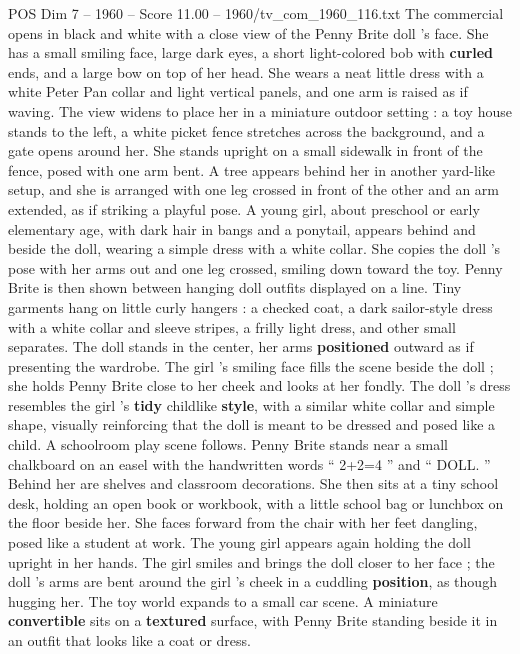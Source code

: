 \begin{textsample}{POS Dim 7 – 1960 – Score 11.00 – 1960/tv\_com\_1960\_116.txt}  \label{ex:f7_pos_030}
The commercial opens in black and white with a close view of the Penny Brite doll ’s face.
She has a small smiling face, large dark eyes, a short light-colored bob with \textbf{curled} ends, and a large bow on top of her head.
She wears a neat little dress with a white Peter Pan collar and light vertical panels, and one arm is raised as if waving.
The view widens to place her in a miniature outdoor setting : a toy house stands to the left, a white picket fence stretches across the background, and a gate opens around her.
She stands upright on a small sidewalk in front of the fence, posed with one arm bent.
A tree appears behind her in another yard-like setup, and she is arranged with one leg crossed in front of the other and an arm extended, as if striking a playful pose.
A young girl, about preschool or early elementary age, with dark hair in bangs and a ponytail, appears behind and beside the doll, wearing a simple dress with a white collar.
She copies the doll ’s pose with her arms out and one leg crossed, smiling down toward the toy.
Penny Brite is then shown between hanging doll outfits displayed on a line.
Tiny garments hang on little curly hangers : a checked coat, a dark sailor-style dress with a white collar and sleeve stripes, a frilly light dress, and other small separates.
The doll stands in the center, her arms \textbf{positioned} outward as if presenting the wardrobe.
The girl ’s smiling face fills the scene beside the doll ; she holds Penny Brite close to her cheek and looks at her fondly.
The doll ’s dress resembles the girl ’s \textbf{tidy} childlike \textbf{style}, with a similar white collar and simple shape, visually reinforcing that the doll is meant to be dressed and posed like a child.
A schoolroom play scene follows.
Penny Brite stands near a small chalkboard on an easel with the handwritten words “ 2+2=4 ” and “ DOLL. ” Behind her are shelves and classroom decorations.
She then sits at a tiny school desk, holding an open book or workbook, with a little school bag or lunchbox on the floor beside her.
She faces forward from the chair with her feet dangling, posed like a student at work.
The young girl appears again holding the doll upright in her hands.
The girl smiles and brings the doll closer to her face ; the doll ’s arms are bent around the girl ’s cheek in a cuddling \textbf{position}, as though hugging her.
The toy world expands to a small car scene.
A miniature \textbf{convertible} sits on a \textbf{textured} surface, with Penny Brite standing beside it in an outfit that looks like a coat or dress.

\end{textsample}
